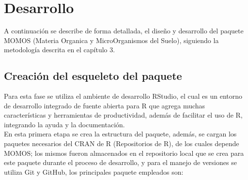 \chapter{Desarrollo}

A continuaci\'on se describe de forma detallada, el dise\~no y desarrollo del paquete MOMOS (Materia Organica y MicroOrganismos del Suelo), siguiendo la metodolog\'ia descrita en el cap\'itulo 3.

\section{Creación del esqueleto del paquete}

Para esta fase se utiliza el ambiente de desarrollo RStudio, el cual es un entorno de desarrollo integrado de fuente abierta para R que agrega muchas caracter\'isticas y herramientas de productividad, adem\'as de facilitar el uso de R, integrando la ayuda y la documentaci\'on.\\

En esta primera etapa se crea la estructura del paquete, además, se cargan los paquetes necesarios del CRAN de R (Repositorios de R), de los cuales depende MOMOS; los mismos fueron almacenados en el repositorio local que se crea para este paquete durante el proceso de desarrollo, y para el manejo de versiones se utiliza Git y GitHub, los principales paquete empleados son:\\

